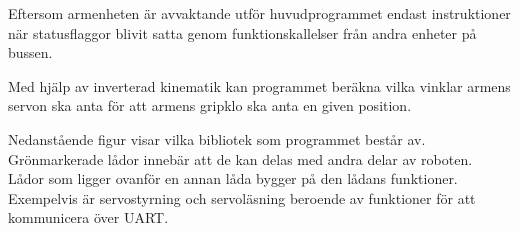 Eftersom armenheten är avvaktande utför huvudprogrammet endast instruktioner när statusflaggor blivit satta genom funktionskallelser från andra enheter på bussen. 

Med hjälp av inverterad kinematik kan programmet beräkna vilka vinklar armens servon ska anta för att armens gripklo ska anta en given position.

Nedanstående figur visar vilka bibliotek som programmet består av. Grönmarkerade lådor innebär att de kan delas med andra delar av roboten. Lådor som ligger ovanför en annan låda bygger på den lådans funktioner. Exempelvis är servostyrning och servoläsning beroende av funktioner för att kommunicera över UART.

